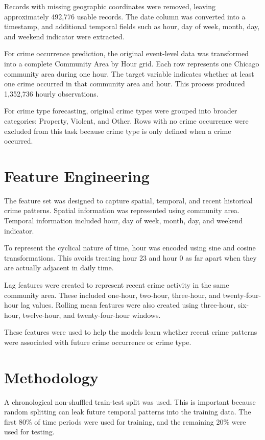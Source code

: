 \documentclass[conference]{IEEEtran}
\begin{document}
Records with missing geographic coordinates were removed, leaving approximately 492,776 usable records. The date column was converted into a timestamp, and additional temporal fields such as hour, day of week, month, day, and weekend indicator were extracted.

For crime occurrence prediction, the original event-level data was transformed into a complete Community Area by Hour grid. Each row represents one Chicago community area during one hour. The target variable indicates whether at least one crime occurred in that community area and hour. This process produced 1,352,736 hourly observations.

For crime type forecasting, original crime types were grouped into broader categories: Property, Violent, and Other. Rows with no crime occurrence were excluded from this task because crime type is only defined when a crime occurred.

\section{Feature Engineering}

The feature set was designed to capture spatial, temporal, and recent historical crime patterns. Spatial information was represented using community area. Temporal information included hour, day of week, month, day, and weekend indicator.

To represent the cyclical nature of time, hour was encoded using sine and cosine transformations. This avoids treating hour 23 and hour 0 as far apart when they are actually adjacent in daily time.

Lag features were created to represent recent crime activity in the same community area. These included one-hour, two-hour, three-hour, and twenty-four-hour lag values. Rolling mean features were also created using three-hour, six-hour, twelve-hour, and twenty-four-hour windows.

These features were used to help the models learn whether recent crime patterns were associated with future crime occurrence or crime type.

\section{Methodology}

A chronological non-shuffled train-test split was used. This is important because random splitting can leak future temporal patterns into the training data. The first 80\% of time periods were used for training, and the remaining 20\% were used for testing.
\end{document}
